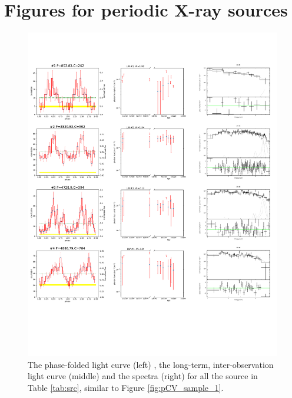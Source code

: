 \documentclass[fleqn,usenatbib]{mnras}
\begin{document}
\section{Figures for periodic X-ray sources}\label{appen:fig}
  \begin{figure}
    \centering
    \includegraphics[page=1,scale=0.90,trim=0 100 0 20,clip]{plot_figure_LW.pdf}
    \caption{The phase-folded light curve (left) , the long-term, inter-observation light curve (middle) and the spectra (right) for all the source in Table \ref{tab:src}, similar to Figure \ref{fig:pCV_sample_1}. 
    \label{fig:Figure_p}}
  \end{figure}
  
\end{document}

